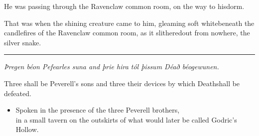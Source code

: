 He was passing through the Ravenclaw common room, on the way to hisdorm.

That was when the shining creature came to him, gleaming soft whitebeneath the candlefires of the Ravenclaw common room, as it slitheredout from nowhere, the silver snake.

\begin{center}\rule{3in}{0.4pt}\end{center}

\emph{Þregen béon Pefearles suna and þrie hira tól þissum Déað béogewunen.}

Three shall be Peverell's sons and three their devices by which Deathshall be defeated.

\begin{itemize}\itemsep1pt\parskip0pt\item  Spoken in the presence of the three Peverell brothers,\\ in a small  tavern on the outskirts of what would later be called Godric's Hollow.\end{itemize}